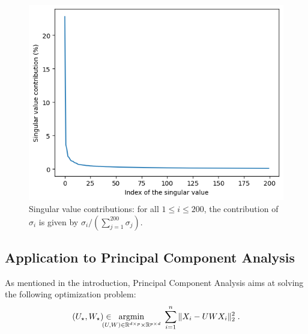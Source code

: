 \begin{figure}
        \centering
            \includegraphics[width=.60\textwidth]{./Illustrations/svd_sv}
        \caption{\small Singular value contributions: for all $1\leqslant i \leqslant 200$, the contribution of $\sigma_i$ is given by $\sigma_i/(\sum_{j=1}^{200}\sigma_j)$.} 
        \label{fig:svd:sv}
    \end{figure}
%

\subsection{Application to Principal Component Analysis}
As mentioned in the introduction, Principal Component Analysis aims at solving the following optimization problem:
\begin{align}
\label{eq:pca:uw}
(U_{\star},W_{\star}) \in \hspace{-0.5cm}\underset{(U,W)\in \rset^{d\times p}\times \rset^{p\times d}}{\mathrm{argmin}} \;\sum_{i=1}^n\|X_i - UWX_i\|_2^2\eqsp.
\end{align}

